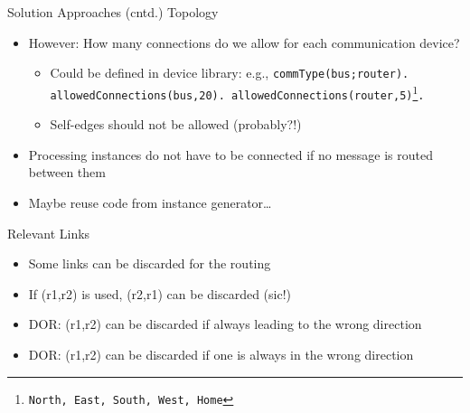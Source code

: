 \documentclass[11pt]{beamer}
\begin{document}
\begin{frame}{Solution Approaches (cntd.)}
  Topology
  \begin{itemize}
  \item However: How many connections do we allow for each communication device?
    \begin{itemize}
      \item Could be defined in device library: e.g., \texttt{commType(bus;router). allowedConnections(bus,20). allowedConnections(router,5)\footnote{North, East, South, West, Home}.}
      \item Self-edges should not be allowed (probably?!)
    \end{itemize}
    \item Processing instances do not have to be connected if no message is routed between them
    \item Maybe reuse code from instance generator\ldots
  \end{itemize}
\end{frame}

\begin{frame}{Relevant Links}
  \begin{itemize}
    \item Some links can be discarded for the routing
    \item If (r1,r2) is used, (r2,r1) can be discarded (sic!)
    \item DOR: (r1,r2) can be discarded if always leading to the wrong direction
    \item DOR: (r1,r2) can be discarded if one is always in the wrong direction
  \end{itemize}
\end{frame}
\end{document}
